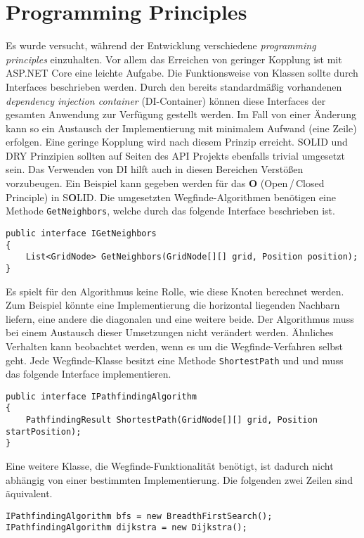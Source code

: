 \part{Programming Principles}
Es wurde versucht, während der Entwicklung
verschiedene \textit{programming principles} einzuhalten.
Vor allem das Erreichen von geringer Kopplung ist mit
ASP.NET Core eine leichte Aufgabe.
Die Funktionsweise von Klassen sollte durch Interfaces beschrieben werden.
Durch den bereits standardmäßig vorhandenen \textit{dependency injection container} (DI-Container)
können diese Interfaces der gesamten Anwendung zur Verfügung gestellt werden.
Im Fall von einer Änderung kann so ein Austausch der
Implementierung mit minimalem Aufwand (eine Zeile) erfolgen.
Eine geringe Kopplung wird nach diesem Prinzip erreicht.
SOLID und DRY Prinzipien sollten auf Seiten des API Projekts ebenfalls trivial umgesetzt sein.
Das Verwenden von DI hilft auch in diesen Bereichen Verstößen vorzubeugen.
Ein Beispiel kann gegeben werden für das \textbf{O} (Open\,/\,Closed Principle)
in S\textbf{O}LID. Die umgesetzten Wegfinde-Algorithmen benötigen eine Methode
\texttt{GetNeighbors}, welche durch das folgende Interface beschrieben ist.

\begin{lstlisting}[caption={GetNeighbors Interface},label={code:i-get-neighbors}]
public interface IGetNeighbors
{
    List<GridNode> GetNeighbors(GridNode[][] grid, Position position);
}
\end{lstlisting}
Es spielt für den Algorithmus keine Rolle, wie diese Knoten berechnet werden.
Zum Beispiel könnte eine Implementierung die horizontal liegenden Nachbarn liefern,
eine andere die diagonalen und eine weitere beide. Der Algorithmus muss bei
einem Austausch dieser Umsetzungen nicht verändert werden. Ähnliches Verhalten kann
beobachtet werden, wenn es um die Wegfinde-Verfahren selbst geht.
Jede Wegfinde-Klasse besitzt eine Methode \texttt{ShortestPath} und
und muss das folgende Interface implementieren.
\begin{lstlisting}[caption={Wegfinde-Algorithmus Interface},label={code:i-pathfinding}]
public interface IPathfindingAlgorithm
{
    PathfindingResult ShortestPath(GridNode[][] grid, Position startPosition);
}
\end{lstlisting}
Eine weitere Klasse, die Wegfinde-Funktionalität benötigt, ist dadurch nicht abhängig
von einer bestimmten Implementierung. Die folgenden zwei Zeilen sind
äquivalent.
\begin{lstlisting}[caption={Abstraktion der Wegfinde-Algorithmen}]
IPathfindingAlgorithm bfs = new BreadthFirstSearch();
IPathfindingAlgorithm dijkstra = new Dijkstra();
\end{lstlisting}